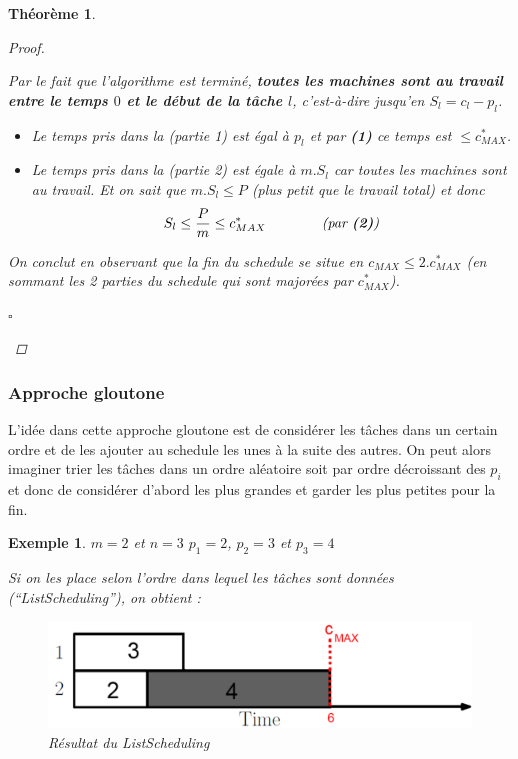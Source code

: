 \documentclass{article}
\newcommand{\cqfd}{\begin{flushright}$\square$\end{flushright}}
\newtheorem{exemple}{Exemple}[section]
\newtheorem{thm}{Th\'eor\`eme}[section]
\newtheorem{proof}{Preuve}[section]
\begin{document}
\begin{sffamily}
\begin{thm}
\begin{proof}
\begin{enumerate}
\newpage
Par le fait que l'algorithme est terminé, \textbf{toutes les machines sont au travail entre le temps $0$ et le début de la tâche $l$}, 
c'est-à-dire jusqu'en $S_l = c_l-p_l$.

\begin{itemize}
\item Le temps pris dans la \textit{(partie 1)} est égal à $p_l$ et par \textbf{(1)} ce temps est $\leq c^*_{MAX}$.
\item Le temps pris dans la \textit{(partie 2)} est égale à $m.S_l$ car toutes les machines sont au travail. Et on sait que $m.S_l \leq 
P$ \textit{(plus petit que le travail total)} et donc $$S_l \leq \frac{P}{m} \leq c^*_{MAX} \qquad\qquad \text{\textit{(par 
\textbf{(2)})}}$$
\end{itemize}
On conclut en observant que la fin du schedule se situe en $c_{MAX} \leq 2.c^*_{MAX}$ (en sommant les 2 parties du schedule qui sont 
majorées par $c^*_{MAX}$).
\end{enumerate}
\cqfd
\end{proof}
\end{thm}

\subsubsection{Approche gloutone}

L'idée dans cette approche gloutone est de considérer les tâches dans un certain ordre et de les ajouter au schedule les unes à la suite 
des autres. On peut alors imaginer trier les tâches dans un ordre aléatoire soit par ordre décroissant des $p_i$ et donc de considérer 
d'abord les plus grandes et garder les plus petites pour la fin.

\begin{exemple}$m=2$ et $n=3$
$p_1 = 2$, $p_2 = 3$ et $p_3=4$

Si on les place selon l'ordre dans lequel les tâches sont données \textit{(``ListScheduling'')}, on obtient :

\begin{figure}[h!]
    \begin{center}
    \includegraphics[scale=0.3]{spm5.pdf}
    \caption{Résultat du ListScheduling}
    \end{center}	
\end{figure}


\end{exemple}
\end{sffamily}
\end{document}
